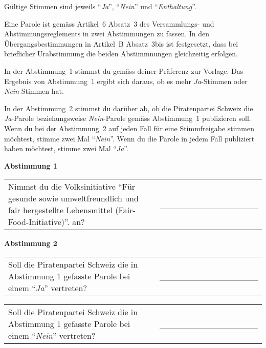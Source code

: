 \documentclass[11pt, a4paper]{scrartcl}
\newcommand{\ja}{\enquote{\textit{Ja}}}
\newcommand{\nein}{\enquote{\textit{Nein}}}
\newcommand{\enthaltung}{\enquote{\textit{Enthaltung}}}
\begin{document}
{\begin{minipage}[t][12.5cm][t]{17.7cm}
\vspace{0.2cm}
Gültige Stimmen sind jeweils \ja{}, \nein{} und \enthaltung{}.

\vspace{0.2cm}
Eine Parole ist gemäss Artikel~6 Absatz~3 des Versammlungs- und Abstimmungsreglements in zwei Abstimmungen zu fassen. In den Übergangsbestimmungen in Artikel~B Absatz~3bis ist festgesetzt, dass bei brieflicher Urabstimmung die beiden Abstimmnungen gleichzeitig erfolgen.

\vspace{0.2cm}
In der Abstimmung~1 stimmst du gemäss deiner Präferenz zur Vorlage. Das Ergebnis von Abstimmung~1 ergibt sich daraus, ob es mehr \textit{Ja}-Stimmen oder \textit{Nein}-Stimmen hat. 

\vspace{0.2cm}
In der Abstimmung~2 stimmst du darüber ab, ob die Piratenpartei Schweiz die \textit{Ja}-Parole beziehungsweise \textit{Nein}-Parole gemäss Abstimmung~1 publizieren soll. Wenn du bei der Abstimmung~2 auf jeden Fall für eine Stimmfreigabe stimmen möchtest, stimme zwei Mal \nein{}. Wenn du die Parole in jedem Fall publiziert haben möchtest, stimme zwei Mal \ja{}.

\vspace{1cm}

\textbf{Abstimmung 1}

\vspace{0.5cm}

\begin{tabular}{ b{13.5cm} b{3cm} }
Nimmst du die Volksinitiative \enquote{Für gesunde sowie umweltfreundlich und fair hergestellte Lebensmittel (Fair-Food-Initiative)}. an?
& \_\_\_\_\_\_\_\_\_\_\_\_\_\_\_\_ \\
\end{tabular}

\vspace{0.5cm}

\textbf{Abstimmung 2}

\vspace{0.5cm}

\begin{tabular}{ b{13.5cm} b{3cm} }
Soll die Piratenpartei Schweiz die in Abstimmung 1 gefasste Parole bei einem \ja{} vertreten?
& \_\_\_\_\_\_\_\_\_\_\_\_\_\_\_\_ \\
\end{tabular}

\vspace{0.5cm}

\begin{tabular}{ b{13.5cm} b{3cm} }
Soll die Piratenpartei Schweiz die in Abstimmung 1 gefasste Parole bei einem \nein{} vertreten? 
& \_\_\_\_\_\_\_\_\_\_\_\_\_\_\_\_ \\
\end{tabular}


\end{minipage}}
\end{document}
